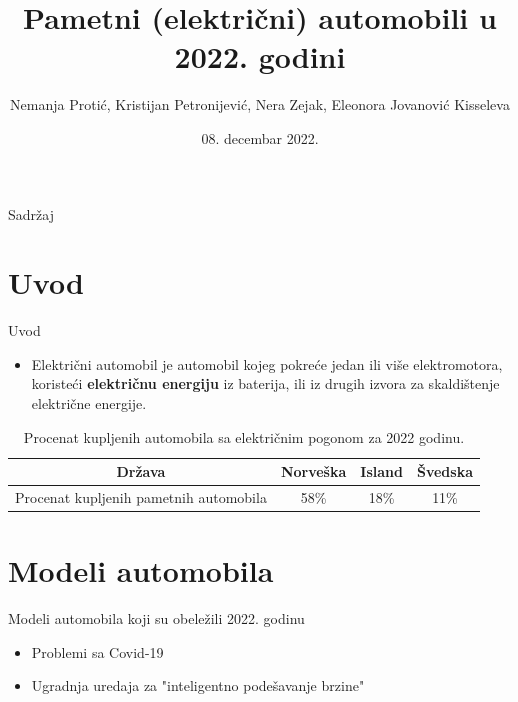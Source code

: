 \documentclass[11pt]{beamer}
\author{Nemanja Protić, Kristijan Petronijević, Nera Zejak, Eleonora Jovanović Kisseleva}
\title{Pametni (električni) automobili u 2022. godini}
\institute[]{Matematički fakultet Univertziteta u Beogradu}
\date{08. decembar 2022.}
\begin{document}
\begin{frame}
\titlepage
\end{frame}

\begin{frame}{Sadržaj}
\tableofcontents 
\end{frame}

\section{Uvod}

\begin{frame}{Uvod}
\begin{itemize}
    \item  Električni automobil  je automobil kojeg pokreće jedan ili više elektromotora, koristeći \textbf{električnu energiju} iz baterija, ili iz drugih izvora za skaldištenje električne energije.
\end{itemize}
\begin{table}[htb]
        \caption{Procenat kupljenih automobila sa električnim pogonom za 2022 godinu.}
        \label{tab:modelo_tabela}
        \centering
       \begin{tabular}{|c|c|c|c|} \hline
Država& Norveška& Island& Švedska\\ \hline
Procenat kupljenih pametnih automobila& 58\%& 18\%& 11\%\\ \hline
\end{tabular}
        
       
    \end{table}

\end{frame}

\section{Modeli automobila}

\begin{frame}{Modeli automobila koji su obeležili 2022. godinu}{\thesection \, \secname}

\begin{itemize}
\item Problemi sa Covid-19 
\item Ugradnja uredaja za "inteligentno podešavanje brzine"
\end{itemize}
\end{frame}
\end{document}

